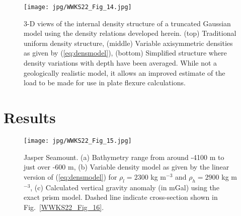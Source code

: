 \begin{figure}
\centering
\texttt{[image: jpg/WWKS22\_Fig\_14.jpg]}
\caption{3-D views of the internal density structure of a truncated Gaussian model using the density
relations developed herein. (top) Traditional uniform density structure, (middle) Variable axisymmetric densities
as given by (\ref{eq:densmodel}), (bottom) Simplified structure where density variations with depth
have been averaged.  While not a geologically realistic model, it allows an improved estimate of the load
to be made for use in plate flexure calculations.}
\label{WWKS22_Fig_14}
\end{figure}

\section{Results}

\begin{figure}
\centering
\texttt{[image: jpg/WWKS22\_Fig\_15.jpg]}
\caption{Jasper Seamount. (a) Bathymetry range from around -4100 m to just over -600 m, (b) Variable density model
as given by the linear version of (\ref{eq:densmodel}) for $\rho_l = 2300$ kg m$^{-3}$ and $\rho_h = 2900$ kg m$^{-3}$,
(c) Calculated vertical gravity anomaly (in mGal) using the exact prism model.  Dashed line indicate cross-section
shown in Fig.~\ref{WWKS22_Fig_16}.}
\label{WWKS22_Fig_15}
\end{figure}

